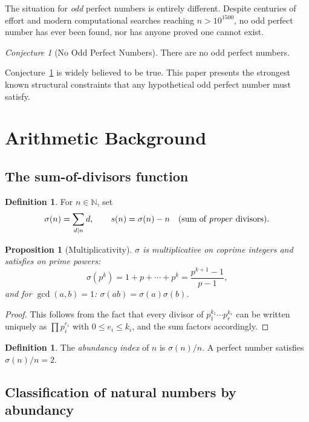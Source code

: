 \documentclass[12pt,a4paper]{amsart}
\newtheorem{proposition}[theorem]{Proposition}
\theoremstyle{definition}
\newtheorem{definition}[theorem]{Definition}
\theoremstyle{remark}
\newtheorem{conjecture}[theorem]{Conjecture}
\newcommand{\N}{\mathbb{N}}
\begin{document}
The situation for \emph{odd} perfect numbers is entirely different.
Despite centuries of effort and modern computational searches reaching
$n > 10^{1500}$, no odd perfect number has ever been found, nor has anyone
proved one cannot exist.

\begin{conjecture}[No Odd Perfect Numbers]
\label{conj:nopn}
There are no odd perfect numbers.
\end{conjecture}

Conjecture~\ref{conj:nopn} is widely believed to be true.
This paper presents the strongest known structural constraints that any
hypothetical odd perfect number must satisfy.

\section{Arithmetic Background}

\subsection{The sum-of-divisors function}

\begin{definition}
For $n \in \N$, set
\[
  \sigma(n) = \sum_{d \mid n} d, \qquad
  s(n) = \sigma(n) - n \quad (\text{sum of \emph{proper} divisors}).
\]
\end{definition}

\begin{proposition}[Multiplicativity]
$\sigma$ is multiplicative on coprime integers and satisfies on prime powers:
\[
  \sigma(p^k) = 1 + p + \cdots + p^k = \frac{p^{k+1}-1}{p-1},
\]
and for $\gcd(a,b)=1$: $\sigma(ab) = \sigma(a)\sigma(b)$.
\end{proposition}

\begin{proof}
This follows from the fact that every divisor of $p_1^{k_1}\cdots p_r^{k_r}$
can be written uniquely as $\prod p_i^{e_i}$ with $0 \leq e_i \leq k_i$,
and the sum factors accordingly.
\end{proof}

\begin{definition}
The \emph{abundancy index} of $n$ is $\sigma(n)/n$.
A perfect number satisfies $\sigma(n)/n = 2$.
\end{definition}

\subsection{Classification of natural numbers by abundancy}
\end{document}
